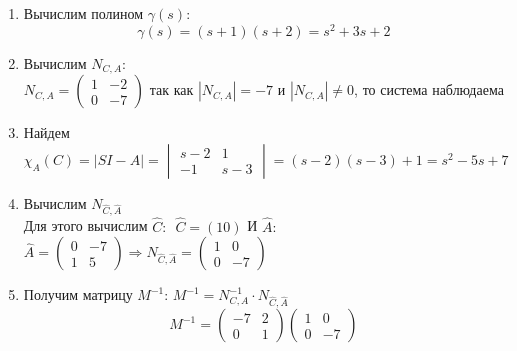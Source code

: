 \documentclass[../../TAU.tex]{subfiles}
\begin{document}
    \begin{enumerate}
        \item Вычислим полином $\gamma(s)$:
            $$\gamma(s)=(s+1)(s+2)=s^2+3s+2$$
        \item Вычислим $N_{C, A}$:\\
            $
                N_{C, A} =
                \begin{pmatrix}
                 1 & -2\\
                 0 & -7
                \end{pmatrix} 
            $
            так как $|N_{C, A}|=-7$ и $|N_{C, A}|\neq0$, то система наблюдаема
        \item Найдем 
        $
            \chi_A(C)=|SI-A|=
            \begin{vmatrix}
                s-2 & 1\\
                -1 & s-3
            \end{vmatrix}
            =(s-2)(s-3)+1=s^2-5s+7
        $
        \item Вычислим $N_{\widehat C,\widehat A}$\\
            Для этого вычислим $\widehat C:$\ \quad$\widehat C=(10)$
            И $\widehat A:$\\
            $
                \widehat A=
                \begin{pmatrix}
                    0 & -7\\
                    1 & 5
                \end{pmatrix}
                \Rightarrow
                N_{\widehat C,\widehat A} =
                \begin{pmatrix}
                    1 & 0\\
                    0 & -7
                \end{pmatrix}
            $ 
        \item Получим матрицу $M^{-1}$: $M^{-1}=N_{C, A}^{-1}\cdot N_{\widehat C, \widehat A}$\\
            $$
                M^{-1}=
                \begin{pmatrix}
                    -7 & 2\\
                    0 & 1
                \end{pmatrix}
                \begin{pmatrix}
                    1 & 0\\
                    0 & -7
                \end{pmatrix}
$$
\end{enumerate}
\end{document}
